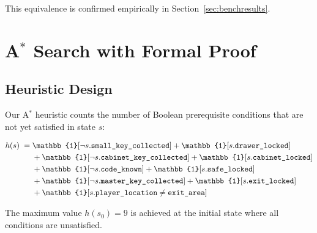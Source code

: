 \documentclass[12pt, a4paper]{report}
\begin{document}
This equivalence is confirmed empirically in Section~\ref{sec:benchresults}.

\section{A$^{\ast}$ Search with Formal Proof}
\label{sec:astar}
\label{sec:astar_proof}

\subsection{Heuristic Design}

Our A$^{\ast}$ heuristic counts the number of Boolean prerequisite conditions
that are not yet satisfied in state $s$:

\begin{align}
h(s) \;=\;
  &\mathbb{1}[\lnot s.\texttt{small\_key\_collected}]
  + \mathbb{1}[s.\texttt{drawer\_locked}] \notag\\
  &+\mathbb{1}[\lnot s.\texttt{cabinet\_key\_collected}]
  + \mathbb{1}[s.\texttt{cabinet\_locked}] \notag\\
  &+\mathbb{1}[\lnot s.\texttt{code\_known}]
  + \mathbb{1}[s.\texttt{safe\_locked}] \notag\\
  &+\mathbb{1}[\lnot s.\texttt{master\_key\_collected}]
  + \mathbb{1}[s.\texttt{exit\_locked}] \notag\\
  &+\mathbb{1}[s.\texttt{player\_location} \neq \texttt{exit\_area}]
\end{align}

The maximum value $h(s_0) = 9$ is achieved at the initial state where all
conditions are unsatisfied.
\end{document}

